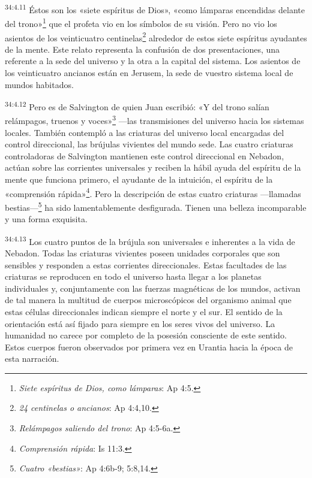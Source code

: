 \par
\textsuperscript{34:4.11} Éstos son los «siete espíritus de Dios», «como lámparas encendidas delante del trono»\footnote{\textit{Siete espíritus de Dios, como lámparas}: Ap 4:5.} que el profeta vio en los símbolos de su visión. Pero no vio los asientos de los veinticuatro centinelas\footnote{\textit{24 centinelas o ancianos}: Ap 4:4,10.} alrededor de estos siete espíritus ayudantes de la mente. Este relato representa la confusión de dos presentaciones, una referente a la sede del universo y la otra a la capital del sistema. Los asientos de los veinticuatro ancianos están en Jerusem, la sede de vuestro sistema local de mundos habitados.

\par
\textsuperscript{34:4.12} Pero es de Salvington de quien Juan escribió: «Y del trono salían relámpagos, truenos y voces»\footnote{\textit{Relámpagos saliendo del trono}: Ap 4:5-6a.} ---las transmisiones del universo hacia los sistemas locales. También contempló a las criaturas del universo local encargadas del control direccional, las brújulas vivientes del mundo sede. Las cuatro criaturas controladoras de Salvington mantienen este control direccional en Nebadon, actúan sobre las corrientes universales y reciben la hábil ayuda del espíritu de la mente que funciona primero, el ayudante de la intuición, el espíritu de la «comprensión rápida»\footnote{\textit{Comprensión rápida}: Is 11:3.}. Pero la descripción de estas cuatro criaturas ---llamadas bestias---\footnote{\textit{Cuatro «bestias»}: Ap 4:6b-9; 5:8,14.} ha sido lamentablemente desfigurada. Tienen una belleza incomparable y una forma exquisita.

\par
\textsuperscript{34:4.13} Los cuatro puntos de la brújula son universales e inherentes a la vida de Nebadon. Todas las criaturas vivientes poseen unidades corporales que son sensibles y responden a estas corrientes direccionales. Estas facultades de las criaturas se reproducen en todo el universo hasta llegar a los planetas individuales y, conjuntamente con las fuerzas magnéticas de los mundos, activan de tal manera la multitud de cuerpos microscópicos del organismo animal que estas células direccionales indican siempre el norte y el sur. El sentido de la orientación está así fijado para siempre en los seres vivos del universo. La humanidad no carece por completo de la posesión consciente de este sentido. Estos cuerpos fueron observados por primera vez en Urantia hacia la época de esta narración.

